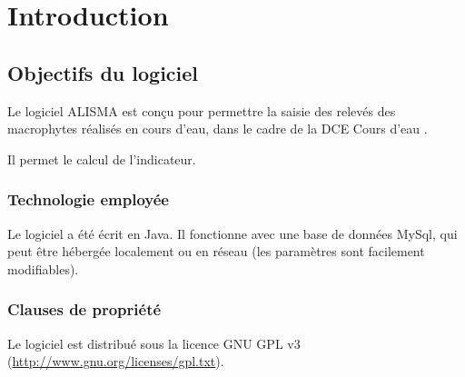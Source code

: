 \chapter{Introduction}

\section{Objectifs du logiciel}
Le logiciel ALISMA est conçu pour permettre la saisie des relevés des macrophytes réalisés en cours d'eau, dans le cadre de la DCE \og Cours d'eau \fg{}. 

Il permet le calcul de l'indicateur.
\subsection{Technologie employée}
Le logiciel a été écrit en Java. Il fonctionne avec une base de données MySql, qui peut être hébergée localement ou en réseau (les paramètres sont facilement modifiables).
\subsection{Clauses de propriété}
Le logiciel est distribué sous la licence GNU GPL v3 (\url{http://www.gnu.org/licenses/gpl.txt}).